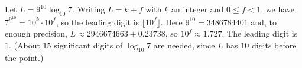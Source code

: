 Let $L=9^{10}\log_{10}7$. Writing $L=k+f$ with $k$ an integer and $0\le f<1$, we have $7^{9^{10}}=10^k\cdot10^f$, so the leading digit is $\lfloor10^f\rfloor$. Here $9^{10}=3486784401$ and, to enough precision, $L\approx2946674663+0.23738$, so $10^f\approx1.727$. The leading digit is $\boxed{1}$. (About $15$ significant digits of $\log_{10}7$ are needed, since $L$ has $10$ digits before the point.)
